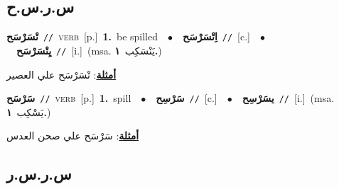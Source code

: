 \documentclass[10pt,a4paper,twoside]{article} %
\begin{document}
\begin{multicols}{2}
\vspace{-3mm}
\subsection*{\color{blue}\foreignlanguage{arabic}{س.ر.س.ح}\color{blue}{}} 

{\setlength\topsep{0pt}\textbf{\foreignlanguage{arabic}{تْسَرْسَح}}\ {\color{gray}\texttt{//}\color{black}}\ \textsc{verb}\ [p.]\ \textbf{1.}~be spilled\ \ $\bullet$\ \ \setlength\topsep{0pt}\textbf{\foreignlanguage{arabic}{اِتْسَرْسَح}}\ {\color{gray}\texttt{//}\color{black}}\ [c.]\ \ $\bullet$\ \ \setlength\topsep{0pt}\textbf{\foreignlanguage{arabic}{يِتْسَرْسَح}}\ {\color{gray}\texttt{//}\color{black}}\ [i.]\ \color{gray}(msa. \foreignlanguage{arabic}{يَنْسَكِب}~\foreignlanguage{arabic}{\textbf{١.}})\color{black}\  \begin{flushright}\color{gray}\foreignlanguage{arabic}{\textbf{\underline{\foreignlanguage{arabic}{أمثلة}}}: تْسَرْسَح علي العصير}\end{flushright}\color{black}} \vspace{2mm}

{\setlength\topsep{0pt}\textbf{\foreignlanguage{arabic}{سَرْسَح}}\ {\color{gray}\texttt{//}\color{black}}\ \textsc{verb}\ [p.]\ \textbf{1.}~spill\ \ $\bullet$\ \ \setlength\topsep{0pt}\textbf{\foreignlanguage{arabic}{سَرْسِح}}\ {\color{gray}\texttt{//}\color{black}}\ [c.]\ \ $\bullet$\ \ \setlength\topsep{0pt}\textbf{\foreignlanguage{arabic}{يسَرْسِح}}\ {\color{gray}\texttt{//}\color{black}}\ [i.]\ \color{gray}(msa. \foreignlanguage{arabic}{يَسْكِب}~\foreignlanguage{arabic}{\textbf{١.}})\color{black}\  \begin{flushright}\color{gray}\foreignlanguage{arabic}{\textbf{\underline{\foreignlanguage{arabic}{أمثلة}}}: سَرْسَح علي صحن العدس}\end{flushright}\color{black}} \vspace{2mm}

\vspace{-3mm}
\subsection*{\color{blue}\foreignlanguage{arabic}{س.ر.س.ر}\color{blue}{}} 


\end{multicols}
\end{document}

